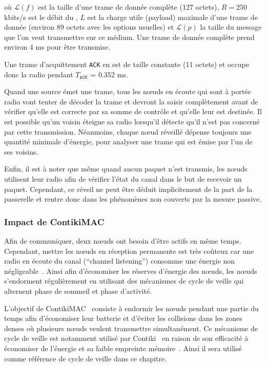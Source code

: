 où $\mathcal{L}(f)$ est la taille d'une trame de donnée complète \ieee{} (127 octets), $R = 250$ kbits/s est le débit du \ieee{}, $L$ est la charge utile (payload) maximale d'une trame de donnée \ieee{} (environ 89 octets avec les options usuelles) et $\mathcal{L}(p)$ la taille du message que l'on veut transmettre sur ce médium.
Une trame de donnée complète prend environ 4 ms pour être transmise.

Une trame d'acquittement \texttt{ACK} en \ieee{} est de taille constante (11 octets) et occupe donc la radio pendant $T_\texttt{ACK}$ = 0.352 ms.

Quand une source émet une trame, tous les nœuds en écoute qui sont à portée radio vont tenter de décoder la trame et devront la saisir complètement avant de vérifier qu'elle est correcte par sa somme de contrôle et qu'elle leur est destinée.
Il est possible qu'un voisin éteigne sa radio lorsqu'il détecte qu'il n'est pas concerné par cette transmission.
Néanmoins, chaque nœud réveillé dépense toujours une quantité minimale d'énergie, pour analyser une trame qui est émise par l'un de ses voisins.

Enfin, il est à noter que même quand aucun paquet n'est transmis, les nœuds utilisent leur radio afin de vérifier l'état du canal dans le but de recevoir un paquet.
Cependant, ce réveil ne peut être déduit implicitement de la part de la passerelle et rentre donc dans les phénomènes non couverts par la mesure passive.

\subsubsection{Impact de ContikiMAC}
\label{supervision:contikimac}

Afin de communiquer, deux nœuds ont besoin d'être actifs en même temps.
Cependant, mettre les nœuds en réception permanente est très coûteux car une radio en écoute du canal (``channel listening'') consomme une énergie non négligeable~\cite{park2005throughput}.
Ainsi afin d'économiser les réserves d'énergie des nœuds, les nœuds s'endorment régulièrement en utilisant des mécanismes de cycle de veille qui alternent phase de sommeil et phase d'activité.

L’objectif de  ContikiMAC~\cite{dunkels11contikimac} consiste à endormir les nœuds pendant une partie du temps afin d’économiser leur batterie et d’éviter les collisions dans les zones denses où plusieurs nœuds veulent transmettre simultanément.
Ce mécanisme de cycle de veille est notamment utilisé par Contiki~\cite{dunkels2004contiki} en raison de son efficacité à économiser de l'énergie et sa faible empreinte mémoire~\cite{michel2014analyse}.
Ainsi il sera utilisé comme référence de cycle de veille dans ce chapitre.

